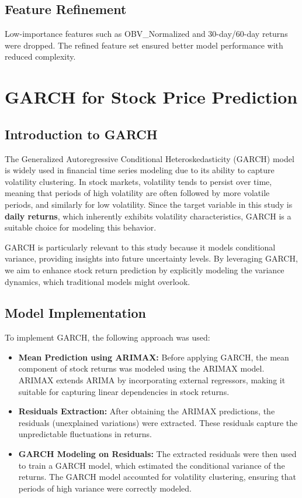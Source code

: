 \subsection{Feature Refinement}
Low-importance features such as OBV\_Normalized and 30-day/60-day returns were dropped. The refined feature set ensured better model performance with reduced complexity.

\section{GARCH for Stock Price Prediction}

\subsection{Introduction to GARCH}

The Generalized Autoregressive Conditional Heteroskedasticity (GARCH) model is widely used in financial time series modeling due to its ability to capture volatility clustering. In stock markets, volatility tends to persist over time, meaning that periods of high volatility are often followed by more volatile periods, and similarly for low volatility. Since the target variable in this study is \textbf{daily returns}, which inherently exhibits volatility characteristics, GARCH is a suitable choice for modeling this behavior.

GARCH is particularly relevant to this study because it models conditional variance, providing insights into future uncertainty levels. By leveraging GARCH, we aim to enhance stock return prediction by explicitly modeling the variance dynamics, which traditional models might overlook.

\subsection{Model Implementation}

To implement GARCH, the following approach was used:

\begin{itemize}
    \item \textbf{Mean Prediction using ARIMAX:} Before applying GARCH, the mean component of stock returns was modeled using the ARIMAX model. ARIMAX extends ARIMA by incorporating external regressors, making it suitable for capturing linear dependencies in stock returns.
    \item \textbf{Residuals Extraction:} After obtaining the ARIMAX predictions, the residuals (unexplained variations) were extracted. These residuals capture the unpredictable fluctuations in returns.
    \item \textbf{GARCH Modeling on Residuals:} The extracted residuals were then used to train a GARCH model, which estimated the conditional variance of the returns. The GARCH model accounted for volatility clustering, ensuring that periods of high variance were correctly modeled.
\end{itemize}

